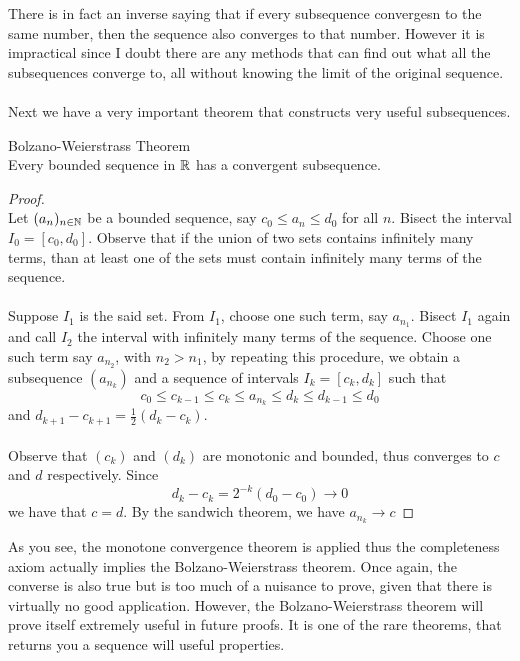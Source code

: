 \documentclass[a4paper]{article}
\begin{document}
There is in fact an inverse saying that if every subsequence convergesn to the same number, then the sequence also converges to that number. However it is impractical since I doubt there are any methods that can find out what all the subsequences converge to, all without knowing the limit of the original sequence. \\~\\

Next we have a very important theorem that constructs very useful subsequences. 

\begin{thm}{Bolzano-Weierstrass Theorem}{}\\ Every bounded sequence in $\mathbb{R}$ has a convergent subsequence. 
\begin{proof}\\ Let $(a_n)_{n\in\mathbb{N}}$ be a bounded sequence, say $c_0\leq a_n\leq d_0$ for all $n$. Bisect the interval $I_0=[c_0,d_0]$. Observe that if the union of two sets contains infinitely many terms, than at least one of the sets must contain infinitely many terms of the sequence. \\~\\
Suppose $I_1$ is the said set. From $I_1$, choose one such term, say $a_{n_1}$. Bisect $I_1$ again and call $I_2$ the interval with infinitely many terms of the sequence. Choose one such term say $a_{n_2}$, with $n_2>n_1$, by repeating this procedure, we obtain a subsequence $(a_{n_k})$ and a sequence of intervals $I_k=[c_k,d_k]$ such that $$c_0\leq c_{k-1}\leq c_k\leq a_{n_k}\leq d_k\leq d_{k-1}\leq d_0$$ and $d_{k+1}-c_{k+1}=\frac{1}{2}(d_k-c_k)$. \\~\\
Observe that $(c_k)$ and $(d_k)$ are monotonic and bounded, thus converges to $c$ and $d$ respectively. Since $$d_k-c_k=2^{-k}(d_0-c_0)\to 0$$ we have that $c=d$. By the sandwich theorem, we have $a_{n_k}\to c$
\end{proof}
\end{thm}

As you see, the monotone convergence theorem is applied thus the completeness axiom actually implies the Bolzano-Weierstrass theorem. Once again, the converse is also true but is too much of a nuisance to prove, given that there is virtually no good application. However, the Bolzano-Weierstrass theorem will prove itself extremely useful in future proofs. It is one of the rare theorems, that returns you a sequence will useful properties. \\~\\
\end{document}
